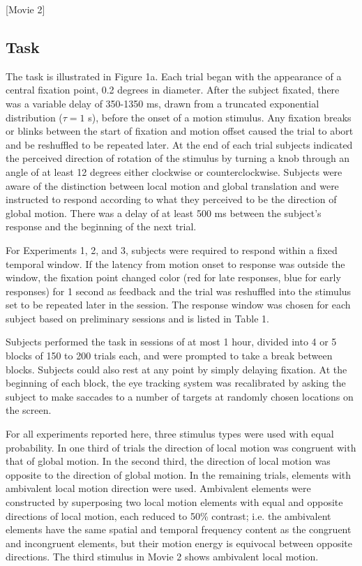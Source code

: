 \documentclass[11pt]{amsart}
\begin{document}
[Movie 2]

\subsection{Task}

The task is illustrated in Figure 1a. Each trial began with the
appearance of a central fixation point, 0.2 degrees in diameter. After
the subject fixated, there was a variable delay of 350-1350 ms, drawn
from a truncated exponential distribution ($\tau = 1$ s), before the
onset of a motion stimulus. Any fixation breaks or blinks between the
start of fixation and motion offset caused the trial to abort and be
reshuffled to be repeated later. At the end of each trial subjects
indicated the perceived direction of rotation of the stimulus by
turning a knob through an angle of at least 12 degrees either
clockwise or counterclockwise. Subjects were aware of the distinction
between local motion and global translation and were instructed to
respond according to what they perceived to be the direction of global
motion. There was a delay of at least 500 ms between the subject's
response and the beginning of the next trial.

For Experiments 1, 2, and 3, subjects were required to respond within
a fixed temporal window. If the latency from motion onset to response
was outside the window, the fixation point changed color (red for late
responses, blue for early responses) for 1 second as feedback and the
trial was reshuffled into the stimulus set to be repeated later in the
session. The response window was chosen for each subject based on
preliminary sessions and is listed in Table 1.

Subjects performed the task in sessions of at most 1 hour, divided
into 4 or 5 blocks of 150 to 200 trials each, and were prompted to
take a break between blocks. Subjects could also rest at any point by
simply delaying fixation. At the beginning of each block, the eye
tracking system was recalibrated by asking the subject to make
saccades to a number of targets at randomly chosen locations on the
screen.

For all experiments reported here, three stimulus types were used with
equal probability. In one third of trials the direction of local
motion was congruent with that of global motion. In the second third,
the direction of local motion was opposite to the direction of global
motion. In the remaining trials, elements with ambivalent local motion
direction were used. Ambivalent elements were constructed by
superposing two local motion elements with equal and opposite
directions of local motion, each reduced to 50\% contrast; i.e. the
ambivalent elements have the same spatial and temporal frequency
content as the congruent and incongruent elements, but their motion
energy is equivocal between opposite directions. The third stimulus in
Movie 2 shows ambivalent local motion.
\end{document}
